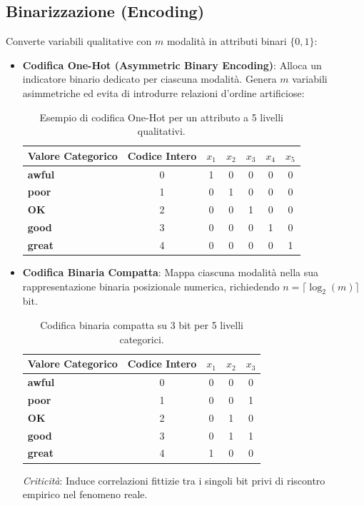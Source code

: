 \FloatBarrier
\subsection{Binarizzazione (Encoding)}

Converte variabili qualitative con $m$ modalità in attributi binari $\{0, 1\}$:

\begin{itemize}
    \item \textbf{Codifica One-Hot (Asymmetric Binary Encoding)}: Alloca un indicatore binario dedicato per ciascuna modalità. Genera $m$ variabili asimmetriche ed evita di introdurre relazioni d'ordine artificiose:
    \begin{table}[H]
        \centering
        \small
        \begin{tabular}{lcccccc}
            \toprule
            \textbf{Valore Categorico} & \textbf{Codice Intero} & $x_1$ & $x_2$ & $x_3$ & $x_4$ & $x_5$ \\
            \midrule
            \textbf{awful} & 0 & 1 & 0 & 0 & 0 & 0 \\
            \textbf{poor}  & 1 & 0 & 1 & 0 & 0 & 0 \\
            \textbf{OK}    & 2 & 0 & 0 & 1 & 0 & 0 \\
            \textbf{good}  & 3 & 0 & 0 & 0 & 1 & 0 \\
            \textbf{great} & 4 & 0 & 0 & 0 & 0 & 1 \\
            \bottomrule
        \end{tabular}
        \caption{Esempio di codifica One-Hot per un attributo a 5 livelli qualitativi.}
        \label{tab:dm-one-hot}
    \end{table}

    \item \textbf{Codifica Binaria Compatta}: Mappa ciascuna modalità nella sua rappresentazione binaria posizionale numerica, richiedendo $n = \lceil \log_2(m) \rceil$ bit.
    \begin{table}[H]
        \centering
        \small
        \begin{tabular}{lcccc}
            \toprule
            \textbf{Valore Categorico} & \textbf{Codice Intero} & $x_1$ & $x_2$ & $x_3$ \\
            \midrule
            \textbf{awful} & 0 & 0 & 0 & 0 \\
            \textbf{poor}  & 1 & 0 & 0 & 1 \\
            \textbf{OK}    & 2 & 0 & 1 & 0 \\
            \textbf{good}  & 3 & 0 & 1 & 1 \\
            \textbf{great} & 4 & 1 & 0 & 0 \\
            \bottomrule
        \end{tabular}
        \caption{Codifica binaria compatta su 3 bit per 5 livelli categorici.}
        \label{tab:dm-compact-binary}
    \end{table}
    \textit{Criticità}: Induce correlazioni fittizie tra i singoli bit privi di riscontro empirico nel fenomeno reale.
\end{itemize}

